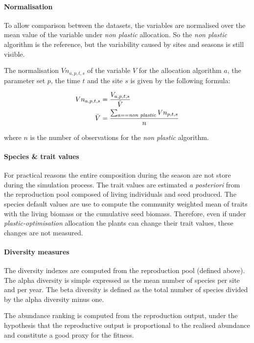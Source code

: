 \paragraph{Normalisation}
To allow comparison between the datasets, the variables are normalised over the mean value of the variable under \textit{non plastic} allocation. So the \textit{non plastic} algorithm is the reference, but the variability caused by sites and seasons is still visible.

The normalisation $Vn_{a, p, t, s}$ of the variable $V$ for the allocation algorithm $a$, the parameter set $p$, the time $t$ and the site $s$ is given by the following formula:

\begin{align}
Vn_{a, p, t, s} &= \frac{V_{a, p, t, s}}{ \bar{V} }\\
\bar{V} &= \frac{\sum_{a == \text{\textit{non plastic}}}{} Vn_{p, t, s} }{n}
\end{align}

where $n$ is the number of observations for the \textit{non plastic} algorithm.

\paragraph{Species \& trait values}

For practical reasons the entire composition during the season are not store during the simulation process. The trait values are estimated \textit{a posteriori} from the reproduction pool composed of living individuals and seed produced. The species default values are use to compute the community weighted mean of traits with the living biomass or the cumulative seed biomass. Therefore, even if under \textit{plastic-optimisation} allocation the plants can change their trait values, these changes are not measured.

\paragraph{Diversity measures}

The diversity indexes are computed from the reproduction pool (defined above). The alpha diversity is simple expressed as the mean number of species per site and per year. The beta diversity is defined as the total number of species divided by the alpha diversity minus one. 

The abundance ranking is computed from the reproduction output, under the hypothesis that the reproductive output is proportional to the realised abundance and constitute a good proxy for the fitness.

